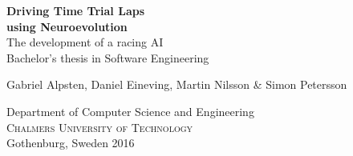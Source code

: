 \begin{titlepage}
			
\addtolength{\voffset}{2cm}

\begin{figure}[H]
\centering
\vspace{1cm}	%
\end{figure}
\setlength{\parindent}{0ex}
\mbox{}
\vfill
\renewcommand{\familydefault}{\sfdefault} \normalfont %


\textbf{{\Huge Driving Time Trial Laps \\using Neuroevolution}} 	\\[0.5cm]
{\Large The development of a racing AI}\\[0.5cm]
Bachelor's thesis in Software Engineering \setlength{\parskip}{1cm}

{\large Gabriel Alpsten, Daniel Eineving, Martin Nilsson \& Simon Petersson} \setlength{\parskip}{2.9cm}

Department of Computer Science and Engineering \\
\textsc{Chalmers University of Technology} \\
Gothenburg, Sweden 2016

\renewcommand{\familydefault}{\rmdefault} \normalfont %
\end{titlepage}


\newpage
\restoregeometry
\thispagestyle{empty}
\mbox{}


